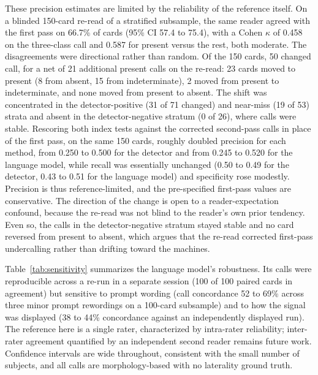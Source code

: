 \documentclass[twocolumn,letterpaper,10pt]{article}
\begin{document}
These precision estimates are limited by the reliability of the reference itself. On a blinded 150-card re-read of a stratified subsample, the same reader agreed with the first pass on 66.7\% of cards (95\% CI 57.4 to 75.4), with a Cohen $\kappa$ of 0.458 on the three-class call and 0.587 for present versus the rest, both moderate.\cite{cohen1960_kappa,kottner2011_grras} The disagreements were directional rather than random. Of the 150 cards, 50 changed call, for a net of 21 additional present calls on the re-read: 23 cards moved to present (8 from absent, 15 from indeterminate), 2 moved from present to indeterminate, and none moved from present to absent. The shift was concentrated in the detector-positive (31 of 71 changed) and near-miss (19 of 53) strata and absent in the detector-negative stratum (0 of 26), where calls were stable. Rescoring both index tests against the corrected second-pass calls in place of the first pass, on the same 150 cards, roughly doubled precision for each method, from 0.250 to 0.500 for the detector and from 0.245 to 0.520 for the language model, while recall was essentially unchanged (0.50 to 0.49 for the detector, 0.43 to 0.51 for the language model) and specificity rose modestly. Precision is thus reference-limited, and the pre-specified first-pass values are conservative. The direction of the change is open to a reader-expectation confound, because the re-read was not blind to the reader's own prior tendency. Even so, the calls in the detector-negative stratum stayed stable and no card reversed from present to absent, which argues that the re-read corrected first-pass undercalling rather than drifting toward the machines.

Table~\ref{tab:sensitivity} summarizes the language model's robustness. Its calls were reproducible across a re-run in a separate session (100 of 100 paired cards in agreement) but sensitive to prompt wording (call concordance 52 to 69\% across three minor prompt rewordings on a 100-card subsample) and to how the signal was displayed (38 to 44\% concordance against an independently displayed run). The reference here is a single rater, characterized by intra-rater reliability; inter-rater agreement quantified by an independent second reader remains future work. Confidence intervals are wide throughout, consistent with the small number of subjects, and all calls are morphology-based with no laterality ground truth.
\end{document}
